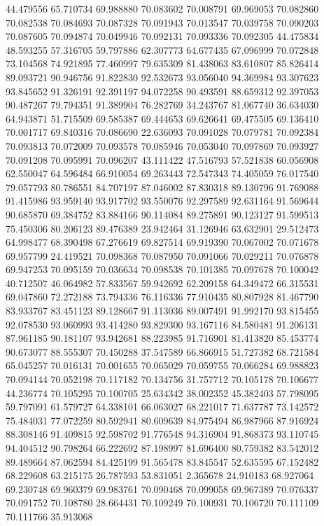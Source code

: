 44.479556
65.710734
69.988880
70.083602
70.008791
69.969053
70.082860
70.082538
70.084693
70.087328
70.091943
70.013547
70.039758
70.090203
70.087605
70.094874
70.049946
70.092131
70.093336
70.092305
44.475834
48.593255
57.316705
59.797886
62.307773
64.677435
67.096999
70.072848
73.104568
74.921895
77.460997
79.635309
81.438063
83.610807
85.826414
89.093721
90.946756
91.822830
92.532673
93.056040
94.369984
93.307623
93.845652
91.326191
92.391197
94.072258
90.493591
88.659312
92.397053
90.487267
79.794351
91.389904
76.282769
34.243767
81.067740
36.634030
64.943871
51.715509
69.585387
69.444653
69.626641
69.475505
69.136410
70.001717
69.840316
70.086690
22.636093
70.091028
70.079781
70.092384
70.093813
70.072009
70.093578
70.085946
70.053040
70.097869
70.093927
70.091208
70.095991
70.096207
43.111422
47.516793
57.521838
60.056908
62.550047
64.596484
66.910054
69.263443
72.547343
74.405059
76.017540
79.057793
80.786551
84.707197
87.046002
87.830318
89.130796
91.769088
91.415986
93.959140
93.917702
93.550076
92.297589
92.631164
91.569644
90.685870
69.384752
83.884166
90.114084
89.275891
90.123127
91.599513
75.450306
80.206123
89.476389
23.942464
31.126946
63.632901
29.512473
64.998477
68.390498
67.276619
69.827514
69.919390
70.067002
70.071678
69.957799
24.419521
70.098368
70.087950
70.091066
70.029211
70.076878
69.947253
70.095159
70.036634
70.098538
70.101385
70.097678
70.100042
40.712507
46.064982
57.833567
59.942692
62.209158
64.349472
66.315531
69.047860
72.272188
73.794336
76.116336
77.910435
80.807928
81.467790
83.933767
83.451123
89.128667
91.113036
89.007491
91.992170
93.815455
92.078530
93.060993
93.414280
93.829300
93.167116
84.580481
91.206131
87.961185
90.181107
93.942681
88.223985
91.716901
81.413820
85.453774
90.673077
88.555307
70.450288
37.547589
66.866915
51.727382
68.721584
65.045257
70.016131
70.001655
70.065029
70.059755
70.066284
69.988823
70.094144
70.052198
70.117182
70.134756
31.757712
70.105178
70.106677
44.236774
70.105295
70.100705
25.634342
38.002352
45.382403
57.798095
59.797091
61.579727
64.338101
66.063027
68.221017
71.637787
73.142572
75.484031
77.072259
80.592941
80.609639
84.975494
86.987966
87.916924
88.308146
91.409815
92.598702
91.776548
94.316904
91.868373
93.110745
94.404512
90.798264
66.222692
87.198997
81.696400
80.759382
83.542012
89.489664
87.062594
84.425199
91.565478
83.845547
52.635595
67.152482
68.229608
63.215175
26.787593
53.831051
2.365678
24.910183
68.927064
69.230748
69.960379
69.983761
70.090468
70.099058
69.967389
70.076337
70.091752
70.108780
28.664431
70.109249
70.100931
70.106720
70.111109
70.111766
35.913068
